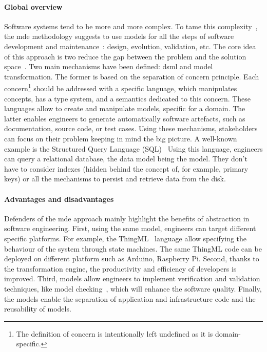 \paragraph{Global overview}    
Software systems tend to be more and more complex.
To tame this complexity~\cite{DBLP:conf/icse/FranceR07, DBLP:journals/computer/Schmidt06}, the \gls{mde} methodology suggests  to use \glspl{model} for all the steps of software development and maintenance~\cite{DBLP:journals/computer/Schmidt06, DBLP:series/synthesis/2017Brambilla, DBLP:conf/icse/HutchinsonRW11, DBLP:conf/uml/BakerLW05, DBLP:conf/icse/HutchinsonWRK11, DBLP:journals/software/AtkinsonK03a}: design, evolution, validation, etc.
The core idea of this approach is two reduce the gap between the problem and the solution space~\cite{DBLP:journals/computer/Schmidt06}.
Two main mechanisms have been defined: \gls{dsml} and model transformation.
The former is based on the separation of concern principle.
Each concern\footnote{The definition of concern is intentionally left undefined as it is domain-specific.} should be addressed with a specific language, which manipulates concepts, has a type system, and a semantics dedicated to this concern.
These languages allow to create and manipulate \glspl{model}, specific for a domain.
The latter enables engineers to generate automatically software artefacts, such as documentation, source code, or test cases.
Using these mechanisms, stakeholders can focus on their problem keeping in mind the big picture.
A well-known example is the Structured Query Language \linebreak (SQL)~\cite{SQL:Spec}
Using this language, engineers can query a relational database, the data model being the \gls{model}.
They don't have to consider indexes (hidden behind the concept of, for example, primary keys) or all the mechanisms to persist and retrieve data from the disk.

\paragraph{Advantages and disadvantages}
Defenders of the \gls{mde} approach mainly highlight the benefits of abstraction in software engineering\cite{DBLP:journals/computer/Schmidt06, DBLP:conf/ifm/Kent02, DBLP:conf/uml/BakerLW05}.
First, using the same \gls{model}, engineers can target different specific platforms.
For example, the ThingML~\cite{DBLP:conf/models/HarrandFMH16} language allow specifying the behaviour of the system through state machines.
The same ThingML code can be deployed on different platform such as Arduino, Raspberry Pi.
Second, thanks to the transformation engine, the productivity and efficiency of developers is improved.
Third, \glspl{model} allow engineers to implement verification and validation techniques, like model checking~\cite{DBLP:books/daglib/0020348}, which will enhance the software quality.
Finally, the \glspl{model} enable the separation of application and infrastructure code and the reusability of \glspl{model}.

